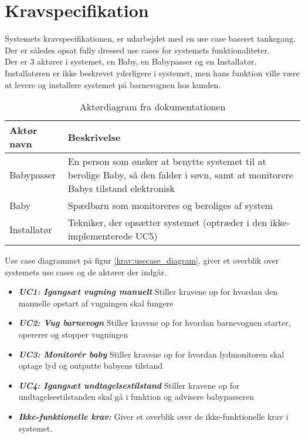 \chapter{Kravspecifikation}

Systemets kravspecifikationen, er udarbejdet med en use case baseret tankegang. Der er således opsat fully dressed use cases for systemets funktionaliteter. \\
Der er 3 aktører i systemet, en Baby, en Babypasser og en Installatør. Installatøren er ikke beskrevet yderligere i systemet, men hans funktion ville være at levere og installere systemet på barnevognen hos kunden.

\begin{table}[!htbp] \centering
	\caption{Aktørdiagram fra dokumentationen}
	\label{krav:aktoerdiagram}
	\begin{tabular}{|p{2.5cm}|p{11.5cm}|}
	\hline
		\textbf{Aktør navn} & \textbf{Beskrivelse} \\\hline
		Babypasser 
		& En person som ønsker at benytte systemet til at 
		  berolige Baby, så den falder i søvn, samt at monitorere Babys tilstand elektronisk
		\\\hline
		Baby 
		& Spædbarn som monitoreres og beroliges af system
		\\\hline
		Installatør
		& Tekniker, der opsætter systemet (optræder i den ikke-implementerede UC5)
		\\\hline
	\end{tabular}
\end{table}

Use case diagrammet på figur \ref{krav:usecase_diagram}, giver et overblik over systemets use cases og de aktører der indgår.


\begin{itemize}
\item \textbf{\textit{UC1: Igangsæt vugning manuelt}} Stiller kravene op for hvordan den manuelle opstart af vugningen skal fungere
\item \textbf{\textit{UC2: Vug barnevogn}} Stiller kravene op for hvordan barnevognen starter, opererer og stopper vugningen
\item \textbf{\textit{UC3: Monitorér baby}} Stiller kravene op for hvordan lydmonitoren skal optage lyd og outputte babyens tilstand
\item \textbf{\textit{UC4: Igangsæt undtagelsestilstand}} Stiller kravene op for undtagelsestilstanden skal gå i funktion og advisere babypasseren
\item \textbf{\textit{Ikke-funktionelle krav:}} Giver et overblik over de ikke-funktionelle krav i systemet. 
\end{itemize}

